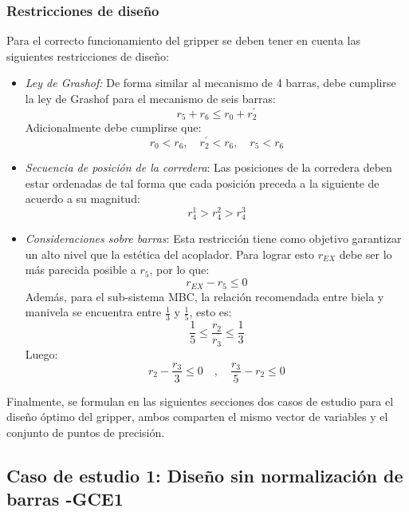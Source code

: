 \subsubsection{Restricciones de diseño}\label{sec:Restricciones de diseño MEC_gripper}
Para el correcto funcionamiento del gripper se deben tener en cuenta las siguientes restricciones de diseño: 
\begin{itemize}
\item \textit{Ley de Grashof:} De forma similar al mecanismo de 4 barras, debe cumplirse la ley de Grashof para el mecanismo de seis barras:
\begin{equation}
r_5+r_6 \leq r_0+r^{\prime}_2
\end{equation}
Adicionalmente debe cumplirse que:
\begin{equation}
r_0<r_6, \quad r^{\prime}_2<r_6 ,\quad r_5 < r_6
\end{equation}

\item \textit{Secuencia de posición de la corredera}: Las  posiciones de la corredera deben estar ordenadas de tal forma que cada posición preceda a la siguiente de acuerdo a su magnitud:
\begin{equation}
r^1_4 > r^2_4 > r^3_4
\end{equation}

\item \textit{Consideraciones sobre barras}: Esta restricción tiene como objetivo garantizar un alto nivel que la estética del acoplador. Para lograr esto $r_{EX}$ debe ser lo más parecida posible a $r_5$, por lo que: 
\begin{equation}
 r_{EX} - r_5 \leq 0
\end{equation}
Además, para el sub-sistema MBC, la relación recomendada entre biela y manivela se encuentra entre $\frac{1}{3}$ y $\frac{1}{5}$, esto es:
\begin{equation}
\frac{1}{5} \leq \frac{r_2}{r_3}\leq \frac{1}{3}
\end{equation}
Luego:
\begin{equation}
r_2 -\frac{r_3}{3} \leq 0 \quad , \quad \frac{r_3}{5} -r_2 \leq 0
\end{equation}
\end{itemize}

Finalmente, se formulan en las siguientes secciones dos casos de estudio para  el diseño óptimo del gripper, ambos comparten el mismo vector de variables y el conjunto de puntos de precisión.
\subsection{Caso de estudio 1: Diseño sin normalización de barras -GCE1}

